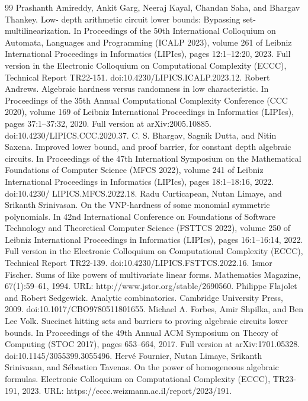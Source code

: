 \documentclass[10pt,a4paper]{article}
\begin{document}
\begin{thebibliography}{99}
 Prashanth Amireddy, Ankit Garg, Neeraj Kayal, Chandan Saha, and Bhargav Thankey. Low- depth arithmetic circuit lower bounds: Bypassing set-multilinearization. In Proceedings of the 50th International Colloquium on Automata, Languages and Programming (ICALP 2023), volume 261 of Leibniz International Proceedings in Informatics (LIPIcs), pages 12:1–12:20, 2023. Full version in the Electronic Colloquium on Computational Complexity (ECCC), Technical Report TR22-151. doi:10.4230/LIPICS.ICALP.2023.12.
 Robert Andrews. Algebraic hardness versus randomness in low characteristic. In Proceedings of the 35th Annual Computational Complexity Conference (CCC 2020), volume 169 of Leibniz International Proceedings in Informatics (LIPIcs), pages 37:1–37:32, 2020. Full version at arXiv:2005.10885. doi:10.4230/LIPICS.CCC.2020.37.
 C. S. Bhargav, Sagnik Dutta, and Nitin Saxena. Improved lower bound, and proof barrier, for constant depth algebraic circuits. In Proceedings of the 47th Internationl Symposium on the Mathematical Foundations of Computer Science (MFCS 2022), volume 241 of Leibniz International Proceedings in Informatics (LIPIcs), pages 18:1–18:16, 2022. doi:10.4230/ LIPICS.MFCS.2022.18.
 Radu Curticapean, Nutan Limaye, and Srikanth Srinivasan. On the VNP-hardness of some monomial symmetric polynomials. In 42nd International Conference on Foundations of Software Technology and Theoretical Computer Science (FSTTCS 2022), volume 250 of Leibniz International Proceedings in Informatics (LIPIcs), pages 16:1–16:14, 2022. Full version in the Electronic Colloquium on Computational Complexity (ECCC), Technical Report TR22-139. doi:10.4230/LIPICS.FSTTCS.2022.16.
 Ismor Fischer. Sums of like powers of multivariate linear forms. Mathematics Magazine, 67(1):59–61, 1994. URL: http://www.jstor.org/stable/2690560.
 Philippe Flajolet and Robert Sedgewick. Analytic combinatorics. Cambridge University Press, 2009. doi:10.1017/CBO9780511801655.
 Michael A. Forbes, Amir Shpilka, and Ben Lee Volk. Succinct hitting sets and barriers to proving algebraic circuits lower bounds. In Proceedings of the 49th Annual ACM Symposium on Theory of Computing (STOC 2017), pages 653–664, 2017. Full version at arXiv:1701.05328. doi:10.1145/3055399.3055496.
 Hervé Fournier, Nutan Limaye, Srikanth Srinivasan, and Sébastien Tavenas. On the power of homogeneous algebraic formulas. Electronic Colloquium on Computational Complexity (ECCC), TR23-191, 2023. URL: https://eccc.weizmann.ac.il/report/2023/191.

\end{thebibliography}
\end{document}
